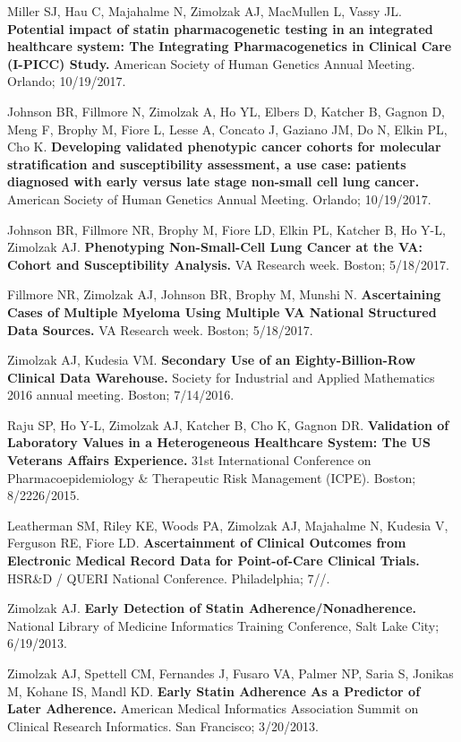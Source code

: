 \documentclass[10pt]{article}
\begin{document}
Miller SJ, Hau C, Majahalme N, Zimolzak AJ, MacMullen L, Vassy JL.
\textbf{Potential impact of statin pharmacogenetic testing in an
  integrated healthcare system: The Integrating Pharmacogenetics in
  Clinical Care (I-PICC) Study.} American Society of Human Genetics
Annual Meeting. Orlando; 10/19/2017.

Johnson BR, Fillmore N, Zimolzak A, Ho YL, Elbers D, Katcher B, Gagnon
D, Meng F, Brophy M, Fiore L, Lesse A, Concato J, Gaziano JM, Do N,
Elkin PL, Cho K. \textbf{Developing validated phenotypic cancer
  cohorts for molecular stratification and susceptibility assessment,
  a use case: patients diagnosed with early versus late stage
  non-small cell lung cancer.} American Society of Human Genetics
Annual Meeting. Orlando; 10/19/2017.

Johnson BR, Fillmore NR, Brophy M, Fiore LD, Elkin PL, Katcher B, Ho Y-L,
Zimolzak AJ. \textbf{Phenotyping Non-Small-Cell Lung Cancer at the VA:
  Cohort and Susceptibility Analysis.} VA Research week. Boston;
5/18/2017.

Fillmore NR, Zimolzak AJ, Johnson BR, Brophy M, Munshi N.
\textbf{Ascertaining Cases of Multiple Myeloma Using Multiple VA
  National Structured Data Sources.} VA Research week. Boston;
5/18/2017.

Zimolzak AJ, Kudesia VM. \textbf{Secondary Use of an
  Eighty-Billion-Row Clinical Data Warehouse.} Society for Industrial
and Applied Mathematics 2016 annual meeting. Boston; 7/14/2016.

Raju SP, Ho Y-L, Zimolzak AJ, Katcher B, Cho K, Gagnon DR.
\textbf{Validation of Laboratory Values in a Heterogeneous Healthcare
  System: The US Veterans Affairs Experience.} 31st International
Conference on Pharmacoepidemiology \& Therapeutic Risk Management
(ICPE). Boston; 8/22\ndash{}26/2015.

Leatherman SM, Riley KE, Woods PA, Zimolzak AJ, Majahalme N, Kudesia
V, Ferguson RE, Fiore LD. \textbf{Ascertainment of Clinical Outcomes
  from Electronic Medical Record Data for Point-of-Care Clinical
  Trials.} HSR\&D / QUERI National Conference. Philadelphia;
7/\ndash{}/.

Zimolzak AJ. \textbf{Early Detection of Statin
  Adherence/Nonadherence.} National Library of Medicine Informatics
Training Conference, Salt Lake City; 6/19/2013.

Zimolzak AJ, Spettell CM, Fernandes J, Fusaro VA, Palmer NP, Saria S,
Jonikas M, Kohane IS, Mandl KD. \textbf{Early Statin Adherence As a
  Predictor of Later Adherence.} American Medical Informatics
Association Summit on Clinical Research Informatics. San Francisco;
3/20/2013.
\end{document}
